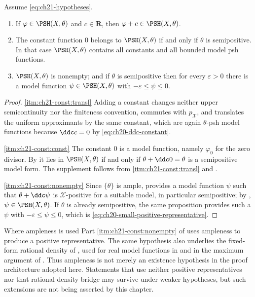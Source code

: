\begin{proposition}
\label{prop:ch21-constants}
Assume \eqref{eq:ch21-hypotheses}.
\begin{enumerate}
\item\label{itm:ch21-const:transl}
If $\varphi\in\PSH(X,\theta)$ and $c\in\mathbf R$, then
$\varphi+c\in\PSH(X,\theta)$.
\item\label{itm:ch21-const:const}
The constant function $0$ belongs to $\PSH(X,\theta)$ if and only if
$\theta$ is semipositive.  In that case $\PSH(X,\theta)$ contains all
constants and all bounded model psh functions.
\item\label{itm:ch21-const:nonempty}
$\PSH(X,\theta)$ is nonempty; and if $\theta$ is semipositive then for
every $\varepsilon>0$ there is a model function
$\psi\in\PSH(X,\theta)$ with $-\varepsilon\leq\psi\leq0$.
\end{enumerate}
\end{proposition}

\begin{proof}
\cref{itm:ch21-const:transl}  Adding a constant changes neither upper
semicontinuity nor the finiteness convention, commutes with
$p_{\mathcal X}$, and translates the uniform approximants by the same
constant, which are again $\theta$-psh model functions because
$\ddc c=0$ by \eqref{eq:ch20-ddc-constant}.

\cref{itm:ch21-const:const}  The constant $0$ is a model function, namely
$\varphi_0$ for the zero divisor.  By
 it lies in $\PSH(X,\theta)$ if and only
if $\theta+\ddc0=\theta$ is a semipositive model form.  The supplement
follows from \cref{itm:ch21-const:transl} and
.

\cref{itm:ch21-const:nonempty}  Since $\{\theta\}$ is ample,
 provides a model function $\psi$
such that $\theta+\ddc\psi$ is $\mathcal X$-positive for a suitable
model, in particular semipositive; by
, $\psi\in\PSH(X,\theta)$.  If
$\theta$ is already semipositive, the same proposition provides such a
$\psi$ with $-\varepsilon\leq\psi\leq0$, which is
\eqref{eq:ch20-small-positive-representative}.
\end{proof}

\begin{warning}{Where ampleness is used}
Part \cref{itm:ch21-const:nonempty} of
 uses ampleness to produce a positive
representative.  The same hypothesis also underlies the fixed-form rational
density of , used for real
model functions in  and in the
maximum argument of .  Thus ampleness is not merely
an existence hypothesis in the proof architecture adopted here.  Statements
that use neither positive representatives nor that rational-density bridge
may survive under weaker hypotheses, but such extensions are not being
asserted by this chapter.
\end{warning}

